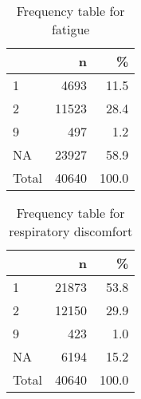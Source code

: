 \documentclass[
]{article}
\newenvironment{Shaded}{\begin{snugshade}}{\end{snugshade}}
\newcommand{\DataTypeTok}[1]{\textcolor[rgb]{0.13,0.29,0.53}{#1}}
\newcommand{\DecValTok}[1]{\textcolor[rgb]{0.00,0.00,0.81}{#1}}
\newcommand{\KeywordTok}[1]{\textcolor[rgb]{0.13,0.29,0.53}{\textbf{#1}}}
\newcommand{\NormalTok}[1]{#1}
\newcommand{\OperatorTok}[1]{\textcolor[rgb]{0.81,0.36,0.00}{\textbf{#1}}}
\newcommand{\OtherTok}[1]{\textcolor[rgb]{0.56,0.35,0.01}{#1}}
\newcommand{\StringTok}[1]{\textcolor[rgb]{0.31,0.60,0.02}{#1}}
\begin{document}
\begin{table}[!h]

\caption{\label{tab:unnamed-chunk-61}Frequency table for fatigue}
\centering
\begin{tabular}[t]{l|r|r}
\hline
  & n & \%\\
\hline
1 & 4693 & 11.5\\
\hline
2 & 11523 & 28.4\\
\hline
9 & 497 & 1.2\\
\hline
NA & 23927 & 58.9\\
\hline
Total & 40640 & 100.0\\
\hline
\end{tabular}
\end{table}

\begin{Shaded}
\end{Shaded}

\begin{table}[!h]

\caption{\label{tab:unnamed-chunk-62}Frequency table for respiratory discomfort}
\centering
\begin{tabular}[t]{l|r|r}
\hline
  & n & \%\\
\hline
1 & 21873 & 53.8\\
\hline
2 & 12150 & 29.9\\
\hline
9 & 423 & 1.0\\
\hline
NA & 6194 & 15.2\\
\hline
Total & 40640 & 100.0\\
\hline
\end{tabular}
\end{table}
\end{document}
